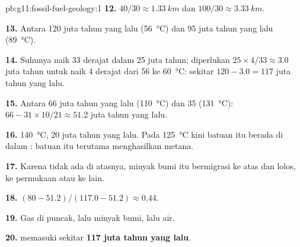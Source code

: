 \begin{solution}{pb:g11:fossil-fuel-geology:1}
\textbf{12.} $40/30 \approx \qty{1.33}{km}$ dan $100/30 \approx
\qty{3.33}{km}$.

\textbf{13.} Antara 120 juta tahun yang lalu (\qty{56}{\degreeCelsius}) dan
95 juta tahun yang lalu (\qty{89}{\degreeCelsius}).

\textbf{14.} Suhunya naik 33 derajat dalam 25 juta tahun; diperlukan
$25 \times 4/33 \approx 3.0$ juta tahun untuk naik 4 derajat dari
\num{56} ke \qty{60}{\degreeCelsius}: sekitar $120 - 3.0 = 117$ juta tahun
yang lalu.

\textbf{15.} Antara 66 juta tahun yang lalu (\qty{110}{\degreeCelsius}) dan
35 (\qty{131}{\degreeCelsius}): $66 - 31 \times 10/21 \approx 51.2$ juta
tahun yang lalu.

\textbf{16.} \qty{140}{\degreeCelsius}, 20 juta tahun yang lalu. Pada
\qty{125}{\degreeCelsius} kini batuan itu berada di dalam : batuan
itu terutama menghasilkan metana.

\textbf{17.} Karena tidak ada  di atasnya, minyak bumi itu bermigrasi
ke atas dan lolos, ke permukaan atau ke  lain.

\textbf{18.} $(80 - 51.2)/(117.0 - 51.2) \approx 0.44$.

\textbf{19.} Gas di puncak, lalu minyak bumi, lalu air.

\textbf{20.}  memasuki  sekitar \textbf{117
juta tahun yang lalu}.
\end{solution}
